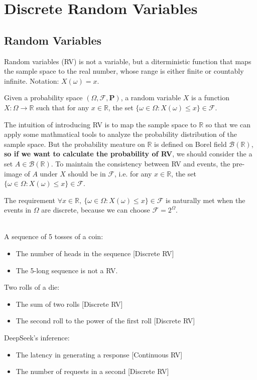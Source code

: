 \chapter{Discrete Random Variables}
\section{Random Variables}
Random variables (RV) is not a variable, but a diterministic function that maps the sample space to the real number, whose range is either finite or countably infinite. Notation: $X(\omega) = x$.
\begin{definition}
    Given a probability space $(\varOmega, \mathcal{F}, \mathbf{P})$, a random variable $X$ is a function $X: \varOmega \rightarrow \mathbb{R}$ such that for any $x \in \mathbb{R}$, the set $\{\omega \in \varOmega: X(\omega) \leq x\} \in \mathcal{F}$.
\end{definition}
The intuition of introducing RV is to map the sample space to $\mathbb{R}$ so that we can apply some mathmatical tools to analyze the probability distribution of the sample space. But the probability meature on $\mathbb{R}$ is defined on Borel field $\mathcal{B}(\mathbb{R})$, \textbf{so if we want to calculate the probability of RV}, we should consider the a set $A \in \mathcal{B}(\mathbb{R})$. To maintain the consistency between RV and events, the pre-image of $A$ under $X$ should be in $\mathcal{F}$, i.e. for any $x \in \mathbb{R}$, the set $\{\omega \in \varOmega: X(\omega) \leq x\} \in \mathcal{F}$.
\begin{remark}
    The requirement $\forall x \in \mathbb{R},~ \{\omega \in \varOmega: X(\omega) \leq x\} \in \mathcal{F}$ is naturally met when the events in $\varOmega$ are discrete, because we can choose $\mathcal{F} = 2^{\varOmega}$.
\end{remark}
\begin{example}[Examples of RV] ~ \\ 
    A sequence of 5 tosses of a coin:
    \begin{itemize}
        \item The number of heads in the sequence [Discrete RV]
        \item The 5-long sequence is not a RV.
    \end{itemize}
    Two rolls of a die:
    \begin{itemize}
        \item The sum of two rolls [Discrete RV]
        \item The second roll to the power of the first roll [Discrete RV]
    \end{itemize}
    DeepSeek's inference:
    \begin{itemize}
        \item The latency in generating a response [Continuous RV]
        \item The number of requests in a second [Discrete RV]
    \end{itemize}
\end{example}

